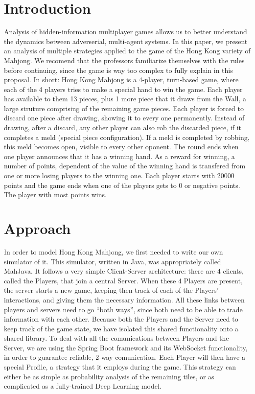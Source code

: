 \documentclass{acmart}
\begin{document}
\section{Introduction}
Analysis of hidden-information multiplayer games allows us to better understand the dynamics between adverserial, multi-agent systems. In this paper, we present
an analysis of multiple strategies applied to the game of the Hong Kong variety of Mahjong. We recomend that the professors familiarize themselves with
the rules\cite{hkmahjongrules} before continuing, since the game is way too complex to fully explain in this proposal. In short: Hong Kong Mahjong is a 4-player,
turn-based game, where each of the 4 players tries to make a special hand to win the game. Each player has available to them 13 pieces, plus 1 more piece that it
draws from the Wall, a large struture comprising of the remaining game pieces. Each player is forced to discard one piece after drawing, showing it to every one
permanently. Instead of drawing, after a discard, any other player can also rob the discarded piece, if it completes a meld (special piece configuration).
If a meld is completed by robbing, this meld becomes open, visible to every other oponent. The round ends when one player announces that it has a winning hand.
As a reward for winning, a number of points, dependent of the value of the winning hand is transfered from one or more losing players to the winning one.
Each player starts with 20000 points and the game ends when one of the players gets to 0 or negative points. The player with most points wins.

\section{Approach}
In order to model Hong Kong Mahjong, we first needed to write our own simulator of it. This simulator, written in Java, was appropriately called MahJava. 
It follows a very simple Client-Server architecture: there are 4 clients, called the Players, that join a central Server. When these 4 Players are present,
the server starts a new game, keeping then track of each of the Players' interactions, and giving them the necessary information. All these links between players and
servers need to go ``both ways'', since both need to be able to trade information with each other. Because both the Players and the Server need to keep track of the
game state, we have isolated this shared functionality onto a shared library.
To deal with all the comunications between Players and the Server, we are using the Spring Boot framework\cite{springbootfw} and its WebSocket\cite{mdnwebsocket}
functionality, in order to guarantee reliable, 2-way comunication.
Each Player will then have a special Profile, a strategy that it employs during the game. This strategy can either be as simple as probability analysis of the remaining
tiles, or as complicated as a fully-trained Deep Learning model.
\end{document}
